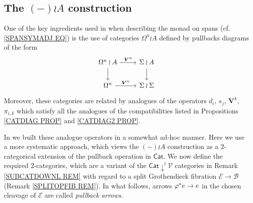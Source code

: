 \documentclass[a4paper,10pt
,draft
]{article}%
\numberwithin{equation}{section}
\numberwithin{figure}{section}
\theoremstyle{definition} %
\newcommand{\Cat}{\mathsf{Cat}}
\newcommand{\V}{\ensuremath{\mathcal V}}
\newcommand{\1}{\ensuremath{\mathbbm 1}}%
\begin{document}
\subsection{The $(-)\wr A$ construction}\label{WRACONST SEC}


One of the key ingredients used in \cite[\S 4.2]{BP_geo} when describing the monad on spans (cf. \eqref{SPANSYMADJ EQ})
is the use of categories 
$\Omega^n \wr A$ defined by pullbacks diagrams of the form
\begin{equation}\label{WRASAMPLE EQ}
\begin{tikzcd}
\Omega^n \wr A \ar{r}{\boldsymbol{V}^n} \ar{d} &
\Sigma \wr A  \ar{d}
\\
\Omega^n \ar{r}{\boldsymbol{V}^n} &
\Sigma \wr \Sigma
\end{tikzcd}
\end{equation}
Moreover, these categories are related by analogues of the operators $d_i$, $s_j$, $\boldsymbol{V}^k$, $\pi_{i,k}$
which satisfy all the analogues of the compatibilities 
listed in Propositions \ref{CATDIAG PROP} and \ref{CATDIAG2 PROP}.

In \cite{BP_geo} we built these analogue operators in a somewhat ad-hoc manner. Here we use a more systematic approach,
which views the $(-) \wr A$ construction as a $2$-categorical extension of the pullback operation in $\Cat$.
We now define the required $2$-categories,
which are a variant of the 
$\mathsf{Cat}\downarrow^l \V$
categories in Remark \ref{SUBCATDOWNL REM} with regard to 
a split Grothendieck fibration $\mathcal{E} \to \mathcal{B}$
(Remark \ref{SPLITOPFIB REM}).
In what follows, arrows 
$\varphi^{\**}e \to e$ in
the chosen cleavage of $\mathcal{E}$ are called \emph{pullback arrows}.
\end{document}
